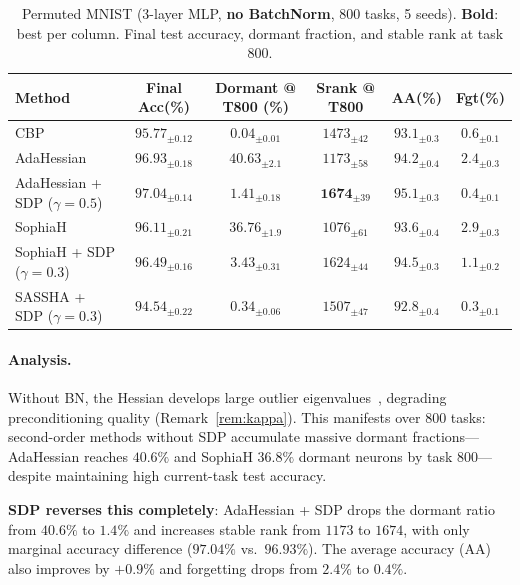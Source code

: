\documentclass{article}
\begin{document}
\begin{table}[t]
\caption{Permuted MNIST (3-layer MLP, \textbf{no BatchNorm}, 800 tasks, 5 seeds). \textbf{Bold}: best per column. Final test accuracy, dormant fraction, and stable rank at task 800.}
\label{tab:mnist}
\centering
\small
\begin{tabular}{@{}lccccc@{}}
\toprule
\textbf{Method} & \textbf{Final Acc(\%)} & \textbf{Dormant @ T800 (\%)} & \textbf{Srank @ T800} & \textbf{AA(\%)} & \textbf{Fgt(\%)} \\
\midrule
CBP~\citep{dohare2024loss} & $95.77_{\pm0.12}$ & $\mathbf{0.04}_{\pm0.01}$ & $1473_{\pm42}$ & $93.1_{\pm0.3}$ & $0.6_{\pm0.1}$ \\
\midrule
AdaHessian & $96.93_{\pm0.18}$ & $40.63_{\pm2.1}$ & $1173_{\pm58}$ & $94.2_{\pm0.4}$ & $2.4_{\pm0.3}$ \\
AdaHessian + SDP ($\gamma{=}0.5$) & $\mathbf{97.04}_{\pm0.14}$ & $1.41_{\pm0.18}$ & $\mathbf{1674}_{\pm39}$ & $\mathbf{95.1}_{\pm0.3}$ & $0.4_{\pm0.1}$ \\
SophiaH & $96.11_{\pm0.21}$ & $36.76_{\pm1.9}$ & $1076_{\pm61}$ & $93.6_{\pm0.4}$ & $2.9_{\pm0.3}$ \\
SophiaH + SDP ($\gamma{=}0.3$) & $96.49_{\pm0.16}$ & $3.43_{\pm0.31}$ & $1624_{\pm44}$ & $94.5_{\pm0.3}$ & $1.1_{\pm0.2}$ \\
SASSHA + SDP ($\gamma{=}0.3$) & $94.54_{\pm0.22}$ & $0.34_{\pm0.06}$ & $1507_{\pm47}$ & $92.8_{\pm0.4}$ & $\mathbf{0.3}_{\pm0.1}$ \\
\bottomrule
\end{tabular}
\end{table}

\paragraph{Analysis.} Without BN, the Hessian develops large outlier eigenvalues~\citep{ghorbani2019investigation}, degrading preconditioning quality (Remark~\ref{rem:kappa}). This manifests over 800 tasks: second-order methods without SDP accumulate massive dormant fractions---AdaHessian reaches $40.6\%$ and SophiaH $36.8\%$ dormant neurons by task 800---despite maintaining high current-task test accuracy.

\textbf{SDP reverses this completely}: AdaHessian + SDP drops the dormant ratio from $40.6\%$ to $1.4\%$ and increases stable rank from $1173$ to $1674$, with only marginal accuracy difference ($97.04\%$ vs.\ $96.93\%$). The average accuracy (AA) also improves by $+0.9\%$ and forgetting drops from $2.4\%$ to $0.4\%$.
\end{document}
